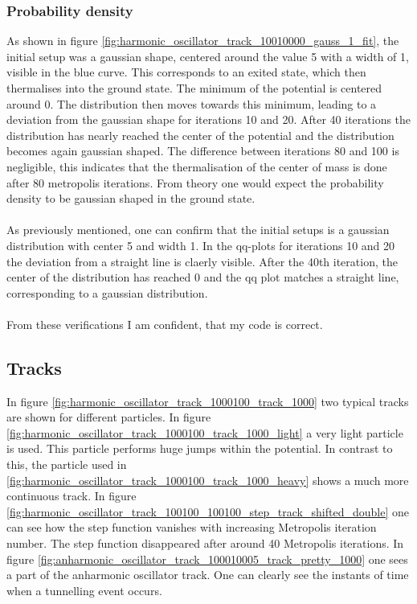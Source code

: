 \documentclass{scrartcl}
\begin{document}
	\subsubsection{Probability density}
		As shown in figure \ref{fig:harmonic_oscillator_track_10010000_gauss_1_fit}, the initial setup was a gaussian shape, centered around the value 5 with a width of 1, visible in the blue curve.
		This corresponds to an exited state, which then thermalises into the ground state.
		The minimum of the potential is centered around 0.
		The distribution then moves towards this minimum, leading to a deviation from the gaussian shape for iterations 10 and 20.
		After 40 iterations the distribution has nearly reached the center of the potential and the distribution becomes again gaussian shaped.
		The difference between iterations 80 and 100 is negligible, this indicates that the thermalisation of the center of mass is done after 80 metropolis iterations.
		From theory one would expect the probability density to be gaussian shaped in the ground state.
		\\\\
		As previously mentioned, one can confirm that the initial setups is a gaussian distribution with center 5 and width 1.
		In the qq-plots for iterations 10 and 20 the deviation from a straight line is claerly visible.
		After the 40th iteration, the center of the distribution has reached 0 and the qq plot matches a straight line, corresponding to a gaussian distribution.
		\\\\
		From these verifications I am confident, that my code is correct.

	\subsection{Tracks}
		In figure \ref{fig:harmonic_oscillator_track_1000100_track_1000} two typical tracks are shown for different particles.
		In figure \ref{fig:harmonic_oscillator_track_1000100_track_1000_light} a very light particle is used.
		This particle performs huge jumps within the potential.
		In contrast to this, the particle used in \ref{fig:harmonic_oscillator_track_1000100_track_1000_heavy} shows a much more continuous track.
		In figure \ref{fig:harmonic_oscillator_track_100100_100100_step_track_shifted_double} one can see how the step function vanishes with increasing Metropolis iteration number.
		The step function disappeared after around 40 Metropolis iterations.
		In figure \ref{fig:anharmonic_oscillator_track_100010005_track_pretty_1000} one sees a part of the anharmonic oscillator track.
		One can clearly see the instants of time when a tunnelling event occurs.
\end{document}
